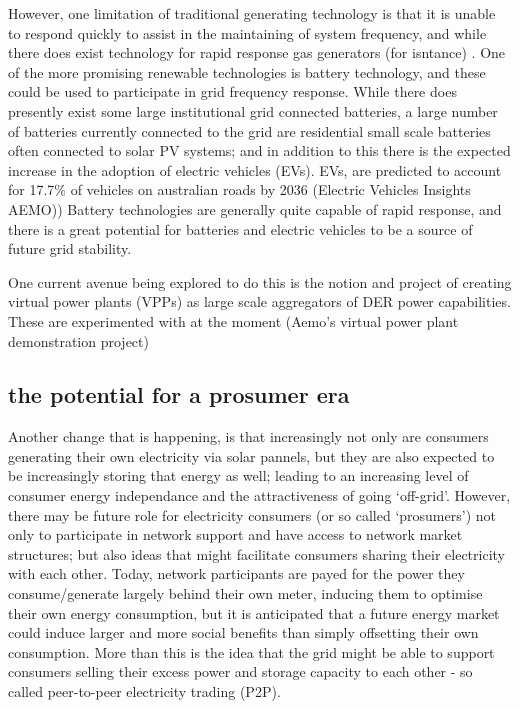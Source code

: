 However, one limitation of traditional generating technology is that it is unable to respond quickly to assist in the maintaining of system frequency, and while there does exist technology for rapid response gas generators (for isntance) \cite{GONZALEZSALAZAR20181497}.
One of the more promising renewable technologies is battery technology, and these could be used to participate in grid frequency response.
While there does presently exist some large institutional grid connected batteries, a large number of batteries currently connected to the grid are residential small scale batteries often connected to solar PV systems; and in addition to this there is the expected increase in the adoption of electric vehicles (EVs).
EVs, are predicted to account for 17.7\% of vehicles on australian roads by 2036 (Electric Vehicles Insights AEMO)) 
Battery technologies are generally quite capable of rapid response, and there is a great potential for batteries and electric vehicles to be a source of future grid stability.

One current avenue being explored to do this is the notion and project of creating virtual power plants (VPPs) as large scale aggregators of DER power capabilities. These are experimented with at the moment (Aemo's virtual power plant demonstration project)

\subsection{the potential for a prosumer era}

Another change that is happening, is that increasingly not only are consumers generating their own electricity via solar pannels, but they are also expected to be increasingly storing that energy as well; leading to an increasing level of consumer energy independance and the attractiveness of going `off-grid'.
However, there may be future role for electricity consumers (or so called `prosumers') not only to participate in network support and have access to network market structures; but also ideas that might facilitate consumers sharing their electricity with each other.
Today, network participants are payed for the power they consume/generate largely behind their own meter, inducing them to optimise their own energy consumption, but it is anticipated that a future energy market could induce larger and more social benefits than simply offsetting their own consumption.
More than this is the idea that the grid might be able to support consumers selling their excess power and storage capacity to each other - so called peer-to-peer electricity trading (P2P).

